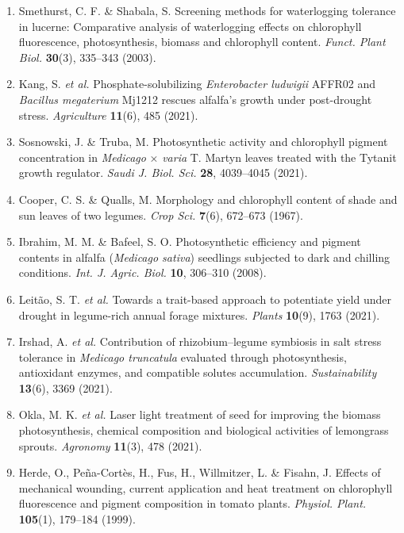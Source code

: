 \documentclass[
]{article}
\begin{document}
\begin{enumerate}
  content in higher plant leaves. \emph{Int. J. Remote Sens.}
  \textbf{18}, 2691--2697 (1997).
\item
  Smethurst, C. F. \& Shabala, S. Screening methods for waterlogging
  tolerance in lucerne: Comparative analysis of waterlogging effects on
  chlorophyll fluorescence, photosynthesis, biomass and chlorophyll
  content. \emph{Funct. Plant Biol.} \textbf{30}(3), 335--343 (2003).
\item
  Kang, S. \emph{et al.} Phosphate-solubilizing \emph{Enterobacter
  ludwigii} AFFR02 and \emph{Bacillus megaterium} Mj1212 rescues
  alfalfa's growth under post-drought stress. \emph{Agriculture}
  \textbf{11}(6), 485 (2021).
\item
  Sosnowski, J. \& Truba, M. Photosynthetic activity and chlorophyll
  pigment concentration in \emph{Medicago} × \emph{varia} T. Martyn
  leaves treated with the Tytanit growth regulator. \emph{Saudi J. Biol.
  Sci.} \textbf{28}, 4039--4045 (2021).
\item
  Cooper, C. S. \& Qualls, M. Morphology and chlorophyll content of
  shade and sun leaves of two legumes. \emph{Crop Sci.} \textbf{7}(6),
  672--673 (1967).
\item
  Ibrahim, M. M. \& Bafeel, S. O. Photosynthetic efficiency and pigment
  contents in alfalfa (\emph{Medicago sativa}) seedlings subjected to
  dark and chilling conditions. \emph{Int. J. Agric. Biol.} \textbf{10},
  306--310 (2008).
\item
  Leitão, S. T. \emph{et al.} Towards a trait-based approach to
  potentiate yield under drought in legume-rich annual forage mixtures.
  \emph{Plants} \textbf{10}(9), 1763 (2021).
\item
  Irshad, A. \emph{et al.} Contribution of rhizobium--legume symbiosis
  in salt stress tolerance in \emph{Medicago truncatula} evaluated
  through photosynthesis, antioxidant enzymes, and compatible solutes
  accumulation. \emph{Sustainability} \textbf{13}(6), 3369 (2021).
\item
  Okla, M. K. \emph{et al.} Laser light treatment of seed for improving
  the biomass photosynthesis, chemical composition and biological
  activities of lemongrass sprouts. \emph{Agronomy} \textbf{11}(3), 478
  (2021).
\item
  Herde, O., Peña-Cortès, H., Fus, H., Willmitzer, L. \& Fisahn, J.
  Effects of mechanical wounding, current application and heat treatment
  on chlorophyll fluorescence and pigment composition in tomato plants.
  \emph{Physiol. Plant.} \textbf{105}(1), 179--184 (1999).
\end{enumerate}
\end{document}

